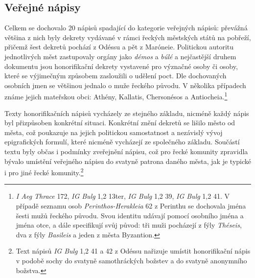 
\subsection[veřejné-nápisy-6]{Veřejné nápisy}

Celkem se dochovalo 20 nápisů spadající do kategorie veřejných nápisů: převážná většina z nich byly dekrety vydávané v rámci řeckých městských států na pobřeží, přičemž šest dekretů pochází z Odéssu a pět z Maróneie. Politickou autoritu jednotlivých měst zastupovaly orgány jako {\em démos} a {\em búlé} a nejčastější druhem dokumentu jsou honorifikační dekrety vystavené pro význačné osoby či osoby, které se výjimečným způsobem zasloužili o udělení poct. Dle dochovaných osobních jmen se většinou jednalo o muže řeckého původu. V několika případech známe jejich mateřskou obci: Athény, Kallatis, Chersonésos a Antiocheia.\footnote{{\em I Aeg Thrace} 172, {\em IG Bulg} 1,2 13ter, {\em IG Bulg} 1,2 39, {\em IG Bulg} 1,2 41. V případě seznamu osob {\em Perinthos-Herakleia} 62 z Perinthu se dochovala jména šesti mužů řeckého původu. Svou identitu udávají pomocí osobního jména a jména otce, a dále specifikují svůj původ: tři muži pocházejí z fýly {\em Théseis}, dva z fýly {\em Basileis} a jeden z města Byzantion.}

Texty honorifikačních nápisů vycházely ze stejného základu, nicméně každý nápis byl přizpůsoben konkrétní situaci. Konkrétní znění dekretů se lišilo město od města, což poukazuje na jejich politickou samostatnost a nezávislý vývoj epigrafických formulí, které nicméně vycházejí ze společného základu. Součástí textu byly občas i podmínky zveřejnění nápisu, což pro řecké komunity zpravidla bývalo umístění veřejného nápisu do svatyně patrona daného města, jak je typické i pro jiné řecké komunity.\footnote{Text nápisů {\em IG Bulg} 1,2 41 a 42 z Odéssu nařizuje umístit honorifikační nápis v podobě sochy do svatyně samothráckých božstev a do svatyně anonymního božstva.}

